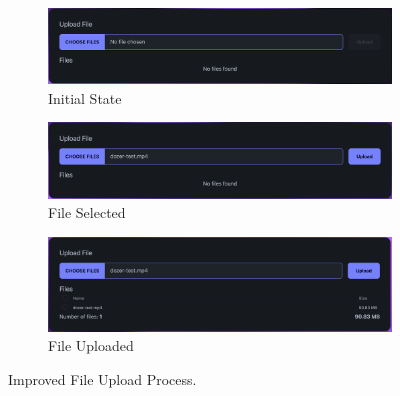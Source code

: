 \begin{figure}[htb]
  \begin{subfigure}{\textwidth}
    \centering
    \includegraphics[width=.9\linewidth]{figures/fix-4.1.png}
    \caption{Initial State}
  \end{subfigure}
  \begin{subfigure}{\textwidth}
    \centering
    \includegraphics[width=.9\linewidth]{figures/fix-4.2.png}
    \caption{File Selected}
  \end{subfigure}
  \begin{subfigure}{\textwidth}
    \centering
    \includegraphics[width=.9\linewidth]{figures/fix-4.3.png}
    \caption{File Uploaded}
  \end{subfigure}
	\caption{Improved File Upload Process.}
  \label{fig:fix-4}
\end{figure}

